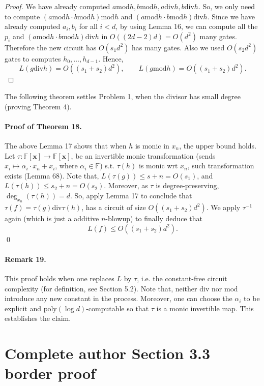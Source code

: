 \begin{proof}
We have already computed $a\mathbin{\mathrm{mod}}h,b\mathbin{\mathrm{mod}}h,a\mathbin{\mathrm{div}}h,b\mathbin{\mathrm{div}}h$. So, we only need to compute $(a\mathbin{\mathrm{mod}}h\cdot b\mathbin{\mathrm{mod}}h)\mathbin{\mathrm{mod}}h$ and $(a\mathbin{\mathrm{mod}}h\cdot b\mathbin{\mathrm{mod}}h)\mathbin{\mathrm{div}}h$. Since we have already computed $a_i,b_i$ for all $i<d$, by using Lemma 16, we can compute all the $p_i$ and $(a\mathbin{\mathrm{mod}}h\cdot b\mathbin{\mathrm{mod}}h)\mathbin{\mathrm{div}}h$ in $O((2d-2)d)=O(d^2)$ many gates. Therefore the new circuit has $O(s_1d^2)$ has many gates. Also we used $O(s_2d^2)$ gates to computes $h_0,\ldots,h_{d-1}$. Hence,
\[L(g\mathbin{\mathrm{div}}h)=O((s_1+s_2)d^2),\qquad L(g\mathbin{\mathrm{mod}}h)=O((s_1+s_2)d^2).\]\end{proof}
The following theorem settles Problem 1, when the divisor has small degree (proving Theorem 4).
\paragraph{Proof of Theorem 18.} The above Lemma 17 shows that when $h$ is monic in $x_n$, the upper bound holds. Let $\tau:\mathbb F[\mathbf x]\longrightarrow\mathbb F[\mathbf x]$, be an invertible monic transformation (sends $x_i\mapsto\alpha_i\cdot x_n+x_i$, where $\alpha_i\in\mathbb F$) s.t. $\tau(h)$ is monic wrt $x_n$, such transformation exists (Lemma 68). Note that, $L(\tau(g))\le s+n=O(s_1)$, and $L(\tau(h))\le s_2+n=O(s_2)$. Moreover, as $\tau$ is degree-preserving, $\deg_{x_n}(\tau(h))=d$.
So, apply Lemma 17 to conclude that $\tau(f)=\tau(g)\mathbin{\mathrm{div}}\tau(h)$, has a circuit of size $O((s_1+s_2)d^2)$. We apply $\tau^{-1}$ again (which is just a additive $n$-blowup) to finally deduce that
\[L(f)\le O((s_1+s_2)d^2).\]\qed
\paragraph{Remark 19.} This proof holds when one replaces $L$ by $\tau$, i.e. the constant-free circuit complexity (for definition, see Section 5.2). Note that, neither $\mathrm{div}$ nor $\mathrm{mod}$ introduce any new constant in the process. Moreover, one can choose the $\alpha_i$ to be explicit and $\mathrm{poly}(\log d)$-computable so that $\tau$ is a monic invertible map. This establishes the claim.
\section*{Complete author Section 3.3 border proof}
